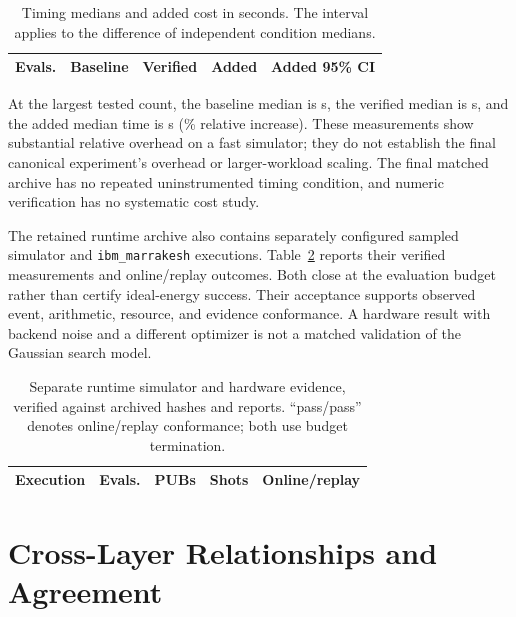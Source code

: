 \documentclass[conference]{IEEEtran}
\begin{document}
\begin{table}[!t]
\centering\footnotesize
\caption{Timing medians and added cost in seconds. The interval applies to the difference of independent condition medians.}
\label{tab:runtime-cost}
\begin{tabular}{@{}rrrrl@{}}\toprule
Evals. & Baseline & Verified & Added & Added 95\% CI \\
\midrule


\end{tabular}
\end{table}

At the largest tested count, the baseline median is \TimingBaselineFinal s, the verified median is \TimingVerifiedFinal s, and the added median time is \TimingAddedFinal s (\TimingRelativeFinal\% relative increase). These measurements show substantial relative overhead on a fast simulator; they do not establish the final canonical experiment's overhead or larger-workload scaling. The final matched archive has no repeated uninstrumented timing condition, and numeric verification has no systematic cost study.

The retained runtime archive also contains separately configured sampled simulator and \texttt{ibm\_marrakesh} executions. Table~\ref{tab:hardware} reports their verified measurements and online/replay outcomes. Both close at the evaluation budget rather than certify ideal-energy success. Their acceptance supports observed event, arithmetic, resource, and evidence conformance. A hardware result with backend noise and a different optimizer is not a matched validation of the Gaussian search model.

\begin{table}[!t]
\centering\footnotesize
\caption{Separate runtime simulator and hardware evidence, verified against archived hashes and reports. ``pass/pass'' denotes online/replay conformance; both use budget termination.}
\label{tab:hardware}
\begin{tabular}{@{}lrrrl@{}}\toprule
Execution & Evals. & PUBs & Shots & Online/replay \\
\midrule


\end{tabular}
\end{table}

\section{Cross-Layer Relationships and Agreement}
\label{sec:crosslayer}
\end{document}

